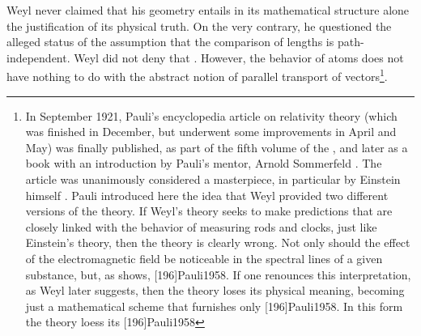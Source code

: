 \documentclass[draft]{article}
\begin{document}
%
Weyl never claimed that his geometry entails in its mathematical structure alone the \apr justification of its physical truth. On the very contrary, he questioned the alleged \apr status of the assumption that the comparison of lengths is path-independent. Weyl did not deny that . However, the behavior of atoms does not have nothing to do with the abstract notion of parallel transport of vectors\footnote{\label{pauli}In September 1921, Pauli's encyclopedia article on relativity theory (which was finished in December, but underwent some improvements in April and May) was finally published, as part of the fifth volume of the , and later as a book with an introduction by Pauli's mentor, Arnold Sommerfeld \citep{Pauli1921}. The article was unanimously considered a masterpiece, in particular by Einstein himself \citep{Einstein1921d}. Pauli introduced here the idea that Weyl provided two different versions of the theory. If Weyl's theory seeks to make predictions that are closely linked with the behavior of measuring rods and clocks, just like Einstein's theory, then the theory is clearly wrong. Not only should the effect of the electromagnetic field be noticeable in the spectral lines of a given substance, but, as \Pauli shows,  [196]{Pauli1958}. If one renounces this interpretation, as Weyl later suggests, then the theory loses its physical meaning, becoming just a mathematical scheme that furnishes only  [196]{Pauli1958}. In this form the theory loess its  [196]{Pauli1958}}.
\end{document}
